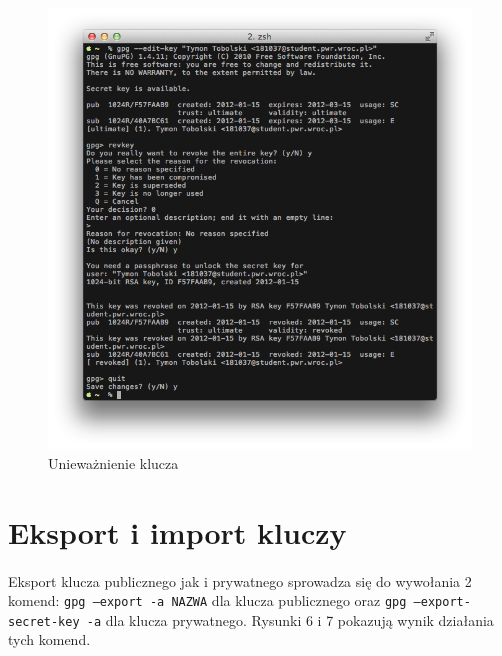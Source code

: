 \documentclass[wide,a4paper,titlepage,12pt] {article}
\begin{document}
  \begin{figure}[h!]
    \begin{center}
      \includegraphics[width=\textwidth]{img/5.png}
      \caption{Unieważnienie klucza}
    \end{center}
  \end{figure}

  \section{Eksport i import kluczy}
  \paragraph{}
  Eksport klucza publicznego jak i prywatnego sprowadza się do wywołania 2 komend: \texttt{gpg --export -a NAZWA} dla klucza publicznego oraz \texttt{gpg --export-secret-key -a} dla klucza prywatnego. Rysunki 6 i 7 pokazują wynik działania tych komend.
\end{document}
